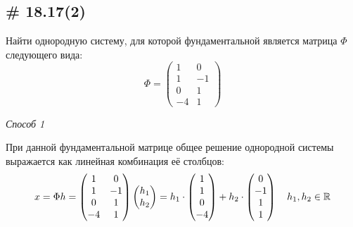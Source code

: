 \documentclass[a4paper,12pt]{article}
\begin{document}
  
  \subsection{\# 18.17(2)}
  
  Найти однородную систему, для которой фундаментальной является матрица $\Phi$ следующего вида:
  \[
    \Phi = \begin{pmatrix}
      1 & 0\\
      1 & -1\\
      0 & 1\\
      -4 & 1
    \end{pmatrix}
  \]
  
  \begin{solution}
    \hphantom{X}\par  %
    
    \emph{Способ 1}
    
    При данной фундаментальной матрице общее решение однородной системы выражается как линейная комбинация её столбцов:
    \begin{equation*}
    \begin{split}
      x = \Phi h = \begin{pmatrix}
          1 & 0\\
          1 & -1\\
          0 & 1\\
          -4 & 1
        \end{pmatrix} \begin{pmatrix}
          h_1 \\ h_2
        \end{pmatrix}
      = h_1 \cdot \begin{pmatrix} 1 \\ 1 \\ 0 \\ -4 \end{pmatrix} +
         h_2 \cdot \begin{pmatrix} 0 \\ -1 \\ 1 \\ 1 \end{pmatrix} \quad h_1, h_2 \in \operatorname{\mathbb R}
    \end{split}
    \end{equation*}
    

\end{solution}
\end{document}
